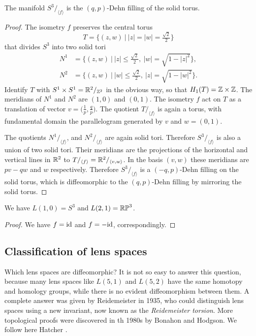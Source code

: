 \begin{prop}
The manifold $S^3/_{\langle f \rangle}$ is the $(q,p)$-Dehn filling of the solid torus.
\end{prop}
\begin{proof}
The isometry $f$ preserves the central torus 
$$T = \big\{(z,w)\ \big|\ |z|=|w| = \tfrac {\sqrt 2}2 \big\}$$
that divides $S^3$ into two solid tori
\begin{align*}
N^1 & = \big\{(z,w)\ \big|\ |z| \leqslant \tfrac {\sqrt 2}2,\ |w| = \sqrt{1-|z|^2}\big\}, \\
N^2 & = \big\{(z,w)\ \big|\ |w| \leqslant \tfrac {\sqrt 2}2,\ |z| = \sqrt{1-|w|^2}\big\}.
\end{align*}
Identify $T$ with $S^1\times S^1 = \mathbb{R}^2/_{\mathbb{Z}^2}$ in the obvious way, so that  $H_1(T) = \mathbb{Z} \times \mathbb{Z}$. The meridians of $N^1$ and $N^2$ are $(1,0)$ and $(0,1)$. The isometry $f$ act on $T$ as a translation of vector $v=\big(\frac 1p, \frac qp\big)$. The quotient $T/_{\langle f\rangle}$ is again a torus, with fundamental domain the parallelogram generated by $v$ and $w=(0,1)$.

The quotients $N^1/_{\langle f \rangle}$, and $N^2/_{\langle f \rangle}$ are again solid tori. Therefore $S^3/_{\langle f \rangle}$ is also a union of two solid tori. Their meridians are the projections of the horizontal and vertical lines in $\mathbb{R}^2$ to $T/_{\langle f \rangle} = \mathbb{R}^2/_{\langle v,w \rangle}$. In the basis $(v,w)$ these meridians are $pv -qw$ and $w$ respectively. Therefore $S^3/_{\langle f\rangle}$ is a $(-q,p)$-Dehn filling on the solid torus, which is diffeomorphic to the $(q,p)$-Dehn filling by mirroring the solid torus.
\end{proof}

\begin{cor}
We have $L(1,0) = S^3$ and $L(2,1) = \mathbb{RP}^3$.
\end{cor}
\begin{proof}
We have $f = {\rm id}$ and $f=-{\rm id}$, correspondingly.
\end{proof}

\subsection{Classification of lens spaces}
Which lens spaces are diffeomorphic? It is not so easy to answer this question, because many lens spaces like $L(5,1)$ and $L(5,2)$ have the same homotopy and homology groups, while there is no evident diffeomorphism between them. 
A complete answer was given by Reidemeister in 1935, who could distinguish lens spaces using a new invariant, now known as the \emph{Reidemeister torsion}. More topological proofs were discovered in th 1980s by Bonahon and Hodgson. We follow here Hatcher \cite{H}.

